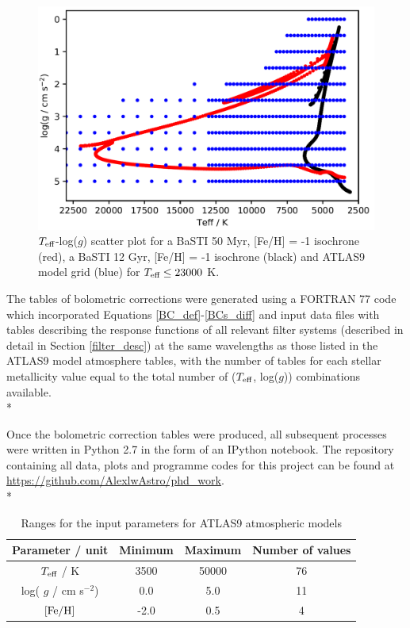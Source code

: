 \documentclass[12pt, a4paper]{report}
\begin{document}
\begin{figure}[h]
\begin{center}
\includegraphics[width=1.0\textwidth]{ATLAS9_grid_BaSTI_coverage_2ages_crop.png}
\caption{$T_{\textnormal{eff}}$-log($g$) scatter plot for a BaSTI 50 Myr, [Fe/H] = -1 isochrone (red), a BaSTI 12 Gyr, [Fe/H] = -1 isochrone (black) and ATLAS9 model grid (blue) for $T_{\textnormal{eff}} \leq 23000$ K.}
\label{Teff-logg coverage}
\end{center}
\end{figure}

The tables of bolometric corrections were generated using a FORTRAN 77 code which incorporated Equations \ref{BC_def}-\ref{BCs_diff} and input data files with tables describing the response functions of all relevant filter systems (described in detail in Section \ref{filter_desc}) at the same wavelengths as those listed in the ATLAS9 model atmosphere tables, with the number of tables for each stellar metallicity value equal to the total number of ($T_{\textnormal{eff}}$, log($g$)) combinations available.\\*

Once the bolometric correction tables were produced, all subsequent processes were written in Python 2.7 in the form of an IPython notebook. The repository containing all data, plots and programme codes for this project can be found at \protect\url{https://github.com/AlexlwAstro/phd_work}.\\*


\begin{table}
\begin{center}
\begin{tabular}{cccc}
\hline
Parameter / unit & Minimum & Maximum & Number of values \\
\hline
$T_{\textnormal{eff}}$ / K & 3500 & 50000 & 76 \\
log( $g$ / cm s$^{-2}$) & 0.0 & 5.0 & 11 \\
$\textnormal{[Fe/H]}$ & -2.0 & 0.5 & 4 \\
\hline
\end{tabular}
\caption{Ranges for the input parameters for ATLAS9 atmospheric models}
\label{atlas9_input}
\end{center}
\end{table}
\end{document}
